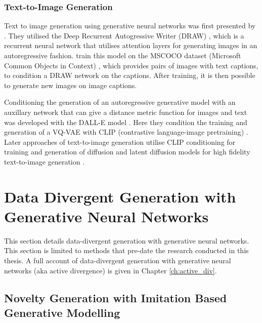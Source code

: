 \subsubsection{Text-to-Image Generation}

Text to image generation using generative neural networks was first presented by \cite{mansimov2015generating}.
They utilised the Deep Recurrent Autogressive Writer (DRAW) \citep{gregor2015draw}, which is a recurrent neural network that utilises attention layers for generating images in an autoregressive fashion.
\cite{mansimov2015generating} train this model on the MSCOCO dataset (Microsoft Common Objects in Context) \citep{lin2014microsoft}, which provides pairs of images with text captions, to condition a DRAW network on the captions.
After training, it is then possible to generate new images on image captions.

Conditioning the generation of an autoregressive generative model with an auxillary network that can give a distance metric function for images and text was developed with the DALL-E model \citep{ramesh2021zero}.
Here they condition the training and generation of a VQ-VAE \citep{razavi2019generating} with CLIP (contrastive language-image pretraining) \citep{radford2021learning}.
Later approaches of text-to-image generation utilise CLIP conditioning for training and generation of diffusion and latent diffusion models for high fidelity text-to-image generation \citep{rombach2022high}.


\section{Data Divergent Generation with Generative Neural Networks}
\label{c2:sec:data-divergent}

This section details data-divergent generation with generative neural networks. 
This section is limited to methods that pre-date the research conducted in this thesis.
A full account of data-divergent generation with generative neural networks (aka active divergence) is given in Chapter \ref{ch:active_div}.

\subsection{Novelty Generation with Imitation Based Generative Modelling}

